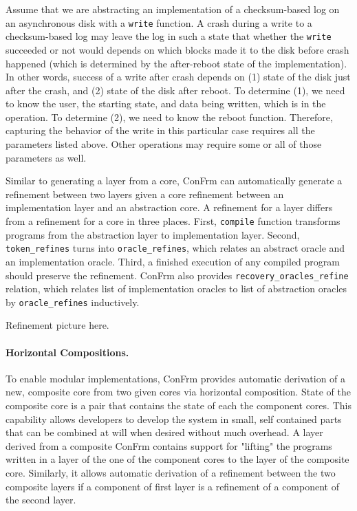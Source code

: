 Assume that we are abstracting an implementation of a checksum-based log on an asynchronous disk with a \texttt{write} function.
A crash during a write to a checksum-based log may leave the log in such a state that whether the \texttt{write} succeeded or not would depends on which blocks made it to the disk before crash happened (which is determined by the after-reboot state of the implementation). In other words, success of a write after crash depends on (1) state of the disk just after the crash, and (2) state of the disk after reboot. To determine (1), we need to know the user, the starting state, and data being written, which is in the operation. To determine (2), we need to know the reboot function. Therefore, capturing the behavior of the write in this particular case requires all the parameters listed above. Other operations may require some or all of those parameters as well.

Similar to generating a layer from a core, ConFrm can automatically generate a refinement between two layers given a core refinement between an implementation layer and an abstraction core. A refinement for a layer differs from a refinement for a core in three places. First, \texttt{compile} function transforms programs from the abstraction layer to implementation layer. Second, \texttt{token\_refines} turns into \texttt{oracle\_refines}, which relates an abstract oracle and an implementation oracle.
Third, a finished execution of any compiled program should preserve the refinement. ConFrm also provides \texttt{recovery\_oracles\_refine} relation, which relates list of implementation oracles to list of abstraction oracles by \texttt{oracle\_refines} inductively.

{\color{red} Refinement picture here.}

\paragraph{Horizontal Compositions.}
To enable modular implementations, ConFrm provides automatic derivation of a new, composite core from two given cores via horizontal composition. State of the composite core is a pair that contains the state of each the component cores. This capability allows developers to develop the system in small, self contained parts that can be combined at will when desired without much overhead. A layer derived from a composite ConFrm contains support for "lifting" the programs written in a layer of the one of the component cores to the layer of the composite core. Similarly, it allows automatic derivation of a refinement between the two composite layers if a component of first layer is a refinement of a component of the second layer.


